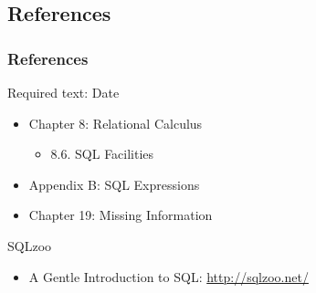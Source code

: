 \documentclass[dvipsnames]{beamer}
\theoremstyle{plain}
\begin{document}
\subsection*{References}

\begin{frame}
  \frametitle{References}

  \begin{block}{Required text: Date}
    \begin{itemize}
      \item Chapter 8: Relational Calculus
      \begin{itemize}
        \item 8.6. \alert{SQL Facilities}
      \end{itemize}

      \item Appendix B: \alert{SQL Expressions}
      \item Chapter 19: Missing Information
    \end{itemize}
  \end{block}

  \begin{block}{SQLzoo}
    \begin{itemize}
      \item A Gentle Introduction to SQL: \url{http://sqlzoo.net/}
    \end{itemize}
  \end{block}
\end{frame}
\end{document}
